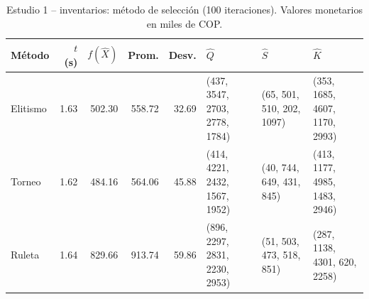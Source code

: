 \begin{table}[!t]
\centering
\scriptsize
\setlength{\tabcolsep}{3pt}
\caption{Estudio 1 -- inventarios: m\'etodo de selecci\'on (100 iteraciones). Valores monetarios en miles de COP.}
\label{tab:t1i}
\begin{tabular}{lrrrrlll}
\hline
M\'etodo & $t$ (s) & $f(\hat{X})$ & Prom. & Desv. & $\hat{Q}$ & $\hat{S}$ & $\hat{K}$ \\
\hline
Elitismo & 1.63 & 502.30 & 558.72 & 32.69 & (437, 3547, 2703, 2778, 1784) & (65, 501, 510, 202, 1097) & (353, 1685, 4607, 1170, 2993) \\
Torneo & 1.62 & 484.16 & 564.06 & 45.88 & (414, 4221, 2432, 1567, 1952) & (40, 744, 649, 431, 845) & (413, 1177, 4985, 1483, 2946) \\
Ruleta & 1.64 & 829.66 & 913.74 & 59.86 & (896, 2297, 2831, 2230, 2953) & (51, 503, 473, 518, 851) & (287, 1138, 4301, 620, 2258) \\
\hline
\end{tabular}
\end{table}
